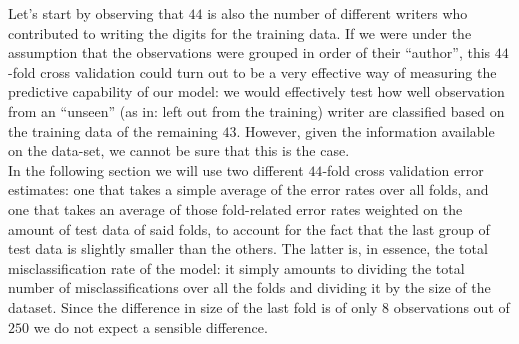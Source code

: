 \documentclass[
  letterpaper,
  DIV=11,
  numbers=noendperiod]{scrartcl}
\begin{document}
Let's start by observing that \(44\) is also the number of different
writers who contributed to writing the digits for the training data. If
we were under the assumption that the observations were grouped in order
of their ``author'', this \(44\)-fold cross validation could turn out to
be a very effective way of measuring the predictive capability of our
model: we would effectively test how well observation from an ``unseen''
(as in: left out from the training) writer are classified based on the
training data of the remaining \(43\). However, given the information
available on the data-set, we cannot be sure that this is the case.\\
In the following section we will use two different \(44\)-fold cross
validation error estimates: one that takes a simple average of the error
rates over all folds, and one that takes an average of those
fold-related error rates weighted on the amount of test data of said
folds, to account for the fact that the last group of test data is
slightly smaller than the others. The latter is, in essence, the total
misclassification rate of the model: it simply amounts to dividing the
total number of misclassifications over all the folds and dividing it by
the size of the dataset. Since the difference in size of the last fold
is of only \(8\) observations out of \(250\) we do not expect a sensible
difference.
\end{document}
